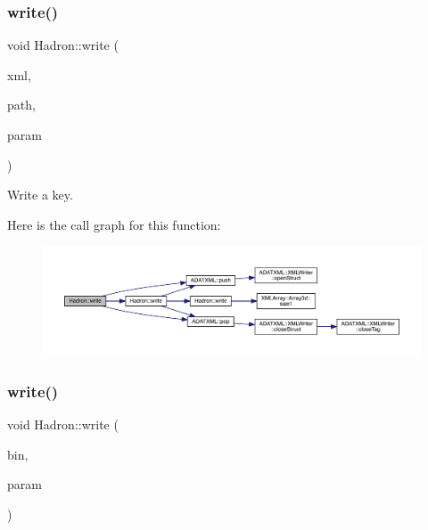 \subsubsection{\texorpdfstring{write()}{write()}\hspace{0.1cm}{\footnotesize\ttfamily [27/95]}}
{\footnotesize\ttfamily void Hadron\+::write (\begin{DoxyParamCaption}\item[{\mbox{\hyperlink{classADATXML_1_1XMLWriter}{X\+M\+L\+Writer}} \&}]{xml,  }\item[{const std\+::string \&}]{path,  }\item[{const \mbox{\hyperlink{structHadron_1_1KeySingleHadronQuarkSpin__t}{Key\+Single\+Hadron\+Quark\+Spin\+\_\+t}} \&}]{param }\end{DoxyParamCaption})}



Write a key. 

Here is the call graph for this function\+:
\nopagebreak
\begin{figure}[H]
\begin{center}
\leavevmode
\includegraphics[width=350pt]{d1/daf/namespaceHadron_a536d0c7d1bd20e64ba84b0588b3696f9_cgraph}
\end{center}
\end{figure}
\mbox{\label{namespaceHadron_ac88cbe3678a2276ee3dd2d55fff0cabf}} 
\subsubsection{\texorpdfstring{write()}{write()}\hspace{0.1cm}{\footnotesize\ttfamily [28/95]}}
{\footnotesize\ttfamily void Hadron\+::write (\begin{DoxyParamCaption}\item[{\mbox{\hyperlink{classADATIO_1_1BinaryWriter}{Binary\+Writer}} \&}]{bin,  }\item[{const \mbox{\hyperlink{structHadron_1_1KeyUnsmearedMesonElementalOperator__t}{Key\+Unsmeared\+Meson\+Elemental\+Operator\+\_\+t}} \&}]{param }\end{DoxyParamCaption})}



